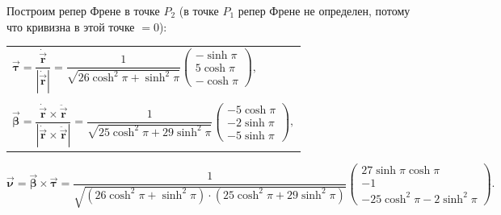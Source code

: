 \documentclass[12pt,a4paper]{article}
\newcommand{\boldVec}[1]{\vec{\mathbf #1}}
\newcommand{\vectorProduct}[2]{\boldVec #1 \times \boldVec #2}
\begin{document}
    Построим репер Френе в точке $ P_2 $ (в точке $ P_1$ репер Френе не определен, потому что кривизна в этой точке $ = 0$):
    \begin{table}[h!]
        \centering
        \begin{tabular}{l}
            $
                \boldVec{\tau} = \dfrac{\dot{\boldVec{r}}}{|\dot{\boldVec{r}}|} = \dfrac{1}{\sqrt{26 \cosh^2 \pi + \sinh^2 \pi}} 
                    \begin{pmatrix}
                        -\sinh \pi 
                        \\
                        5 \cosh \pi
                        \\
                        -\cosh \pi
                    \end{pmatrix}\!,
            $
            \\ \\ 
            $
                \boldVec{\beta} = \dfrac{\dot{\boldVec r} \times \ddot{\boldVec r}}{ | \dot{\boldVec r} \times \ddot{\boldVec r} |} = \dfrac{1}{\sqrt{25\cosh^2 \pi + 29\sinh^2 \pi}} 
                    \begin{pmatrix}
                        -5\cosh \pi 
                        \\
                        -2\sinh \pi
                        \\
                        -5\sinh \pi 
                    \end{pmatrix}\!,
            $
        \end{tabular}
    \end{table}
    \[
        \boldVec{\nu} = \vectorProduct{\beta}{\tau} = \dfrac{1}{\sqrt{(26 \cosh^2 \pi + \sinh^2 \pi) \cdot (25\cosh^2 \pi + 29\sinh^2 \pi)}}
            \begin{pmatrix}
                27 \sinh \pi \cosh \pi
                \\
                -1
                \\
                -25 \cosh^2 \pi - 2\sinh^2 \pi
            \end{pmatrix}\!.
    \]
\end{document}
